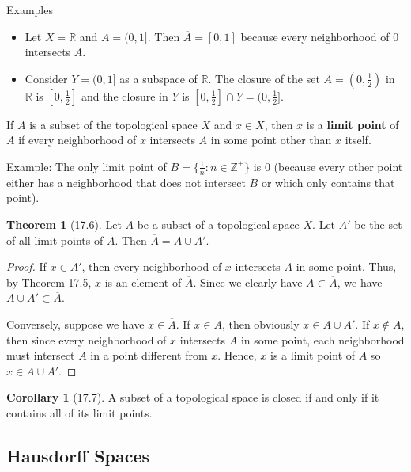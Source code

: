 \documentclass{article}
\newcommand{\nline}{\vspace*{0.5\baselineskip}}
\theoremstyle{definition}
\newtheorem{theorem}{Theorem}[subsection]
\newtheorem{corollary}{Corollary}[subsection]
\begin{document}
\begin{flushleft}
Examples
\begin{itemize}
    \item Let $X = \mathbb{R}$ and $A = (0,1]$. Then $\overline{A} = [0,1]$ because every neighborhood of $0$ intersects $A$.
    \item Consider $Y = (0,1]$ as a subspace of $\mathbb{R}$. The closure of the set $A = (0,\frac{1}{2})$ in $\mathbb{R}$ is $[0,\frac{1}{2}]$ and the closure in $Y$ is $[0, \frac{1}{2}] \cap Y = (0, \frac{1}{2}]$.
\end{itemize}

\nline

If $A$ is a subset of the topological space $X$ and $x \in X$, then $x$ is a \textbf{limit point} of $A$ if every neighborhood of $x$ intersects $A$ in some point other than $x$ itself.

\nline

Example: The only limit point of $B = \{ \frac{1}{n} : n \in \mathbb{Z}^+ \}$ is $0$ (because every other point either has a neighborhood that does not intersect $B$ or which only contains that point).

\begin{theorem}[17.6]
Let $A$ be a subset of a topological space $X$. Let $A'$ be the set of all limit points of $A$. Then $\overline{A} = A \cup A'$.
\end{theorem}

\begin{proof}
If $x \in A'$, then every neighborhood of $x$ intersects $A$ in some point. Thus, by Theorem 17.5, $x$ is an element of $\overline{A}$. Since we clearly have $A \subset \overline{A}$, we have $A \cup A' \subset \overline{A}$.

\nline

Conversely, suppose we have $x \in \overline{A}$. If $x \in A$, then obviously $x \in A \cup A'$. If $x \notin A$, then since every neighborhood of $x$ intersects $A$ in some point, each neighborhood must intersect $A$ in a point different from $x$. Hence, $x$ is a limit point of $A$ so $x \in A \cup A'$.
\end{proof}

\begin{corollary}[17.7]
A subset of a topological space is closed if and only if it contains all of its limit points.
\end{corollary}

\subsection{Hausdorff Spaces}


\end{flushleft}
\end{document}
